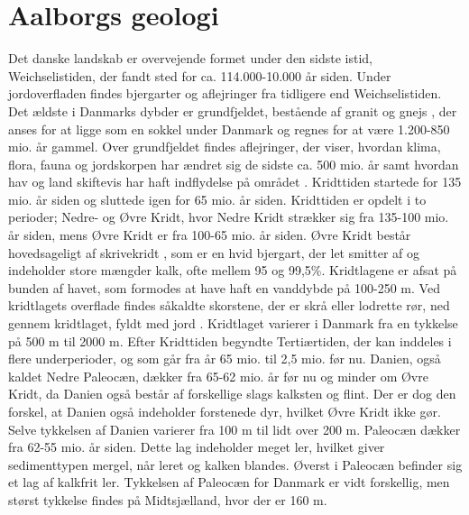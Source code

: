 \section{Aalborgs geologi}
Det danske landskab er overvejende formet under den sidste istid, Weichselistiden, der fandt sted for ca. 114.000-10.000 år siden. Under jordoverfladen findes bjergarter og aflejringer fra tidligere end Weichselistiden. Det ældste i Danmarks dybder er grundfjeldet, bestående af granit og gnejs \citep{geopdf}, der anses for at ligge som en sokkel under Danmark og regnes for at være 1.200-850 mio. år gammel. Over grundfjeldet findes aflejringer, der viser, hvordan klima, flora, fauna og jordskorpen har ændret sig de sidste ca. 500 mio. år samt hvordan hav og land skiftevis har haft indflydelse på området \citep{geolink}.
\newline
\newline
Kridttiden startede for 135 mio. år siden og sluttede igen for 65 mio. år siden. Kridttiden er opdelt i to perioder; Nedre- og Øvre Kridt, hvor Nedre Kridt strækker sig fra 135-100 mio. år siden, mens Øvre Kridt er fra 100-65 mio. år siden.  Øvre Kridt består hovedsageligt af skrivekridt \citep{geopdf}, som er en hvid bjergart, der let smitter af og indeholder store mængder kalk, ofte mellem 95 og 99,5\%. Kridtlagene er afsat på bunden af havet, som formodes at have haft en vanddybde på 100-250 m. Ved kridtlagets overflade findes såkaldte skorstene, der er skrå eller lodrette rør, ned gennem kridtlaget, fyldt med jord \citep[ s. 15-16]{geobog}. Kridtlaget varierer i Danmark fra en tykkelse på 500 m til 2000 m.
\newline
\newline
Efter Kridttiden begyndte Tertiærtiden, der kan inddeles i flere underperioder, og som går fra år 65 mio. til 2,5 mio. før nu.
\newline \indent{     }  Danien, også kaldet Nedre Paleocæn, dækker fra 65-62 mio. år før nu og minder om Øvre Kridt, da Danien også består af forskellige slags kalksten og flint. Der er dog den forskel, at Danien også indeholder forstenede dyr, hvilket Øvre Kridt ikke gør. Selve tykkelsen af Danien varierer fra 100 m til lidt over 200 m.
\newline \indent{     }  Paleocæn dækker fra 62-55 mio. år siden. Dette lag indeholder meget ler, hvilket giver sedimenttypen mergel, når leret og kalken blandes. Øverst i Paleocæn befinder sig et lag af kalkfrit ler. Tykkelsen af Paleocæn for Danmark er vidt forskellig, men størst tykkelse findes på Midtsjælland, hvor der er 160 m.
